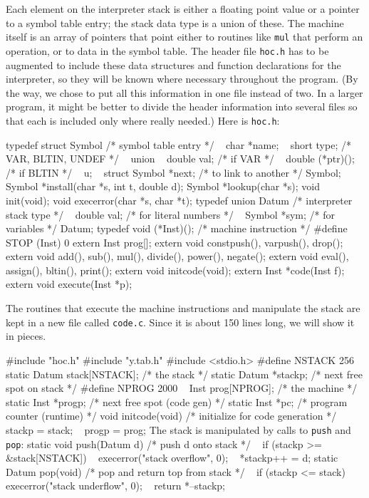 {Each element on the interpreter stack is either a floating point
value or a pointer to a symbol table entry; the stack data type
is a union of these. The machine itself is an array of pointers
that point either to routines like {\tt mul} that perform an
operation, or to data in the symbol table.
The header file {\tt hoc.h} has to be augmented to include these
data structures and function declarations for the interpreter,
so they will be known where necessary throughout the program.
(By the way, we chose to put all this information in one file
instead of two. In a larger program, it might be better to divide
the header information into several files so that each is included
only where really needed.) Here is {\tt hoc.h}:

\begincode
typedef struct Symbol {  /* symbol table entry */
~       char   *name;
~       short   type;    /* VAR, BLTIN, UNDEF */
~       union {
~               double  val;         /* if VAR */
~               double  (*ptr)();    /* if BLTIN */
~       } u;
~       struct Symbol   *next;  /* to link to another */
} Symbol;
\medbreak
Symbol *install(char *s, int t, double d);
Symbol *lookup(char *s);
\medbreak
void init(void);
void execerror(char *s, char *t);
\medbreak
typedef union Datum {    /* interpreter stack type */
~       double  val;     /* for literal numbers */
~       Symbol *sym;     /* for variables */
} Datum;
\medbreak
typedef void (*Inst)();  /* machine instruction */
#define STOP (Inst) 0
\medbreak
extern  Inst prog[];
extern  void constpush(), varpush(), drop();
extern  void add(), sub(), mul(), divide(), power(), negate();
extern  void eval(), assign(), bltin(), print();
\medbreak
extern  void initcode(void);
extern  Inst *code(Inst f);
extern  void execute(Inst *p);
\endcode


The routines that execute the machine instructions and
manipulate the stack are kept in a new file called {\tt code.c}.
Since it is about 150 lines long, we will show it in pieces.

\begincode
#include "hoc.h"
#include "y.tab.h"
#include <stdio.h>
\medbreak
#define NSTACK  256
static  Datum   stack[NSTACK];  /* the stack */
static  Datum  *stackp;         /* next free spot on stack */
\medbreak
#define NPROG   2000
~       Inst    prog[NPROG];    /* the machine */
static  Inst   *progp;          /* next free spot (code gen) */
static  Inst   *pc;             /* program counter (runtime) */
\medbreak
void initcode(void)  /* initialize for code generation */
{
~       stackp = stack;
~       progp = prog;
}
\endcode
\noindent
The stack is manipulated by calls to {\tt push} and {\tt pop}:
\begincode
static void push(Datum d)  /* push d onto stack */
{
~       if (stackp >= &stack[NSTACK])
~               execerror("stack overflow", 0);
~       *stackp++ = d;
}
\medskip
static Datum pop(void)  /* pop and return top from stack */
{
~       if (stackp <= stack)
~               execerror("stack underflow", 0);
~       return *--stackp;
}
\endcode

}
